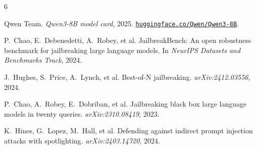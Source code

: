 \documentclass[letterpaper,twocolumn,10pt]{article}
\begin{document}
\begin{thebibliography}{6}
\small\raggedright
{}
Qwen Team. \emph{Qwen3-8B model card}, 2025.
\href{https://huggingface.co/Qwen/Qwen3-8B}{\nolinkurl{huggingface.co/Qwen/Qwen3-8B}}.

P.~Chao, E.~Debenedetti, A.~Robey, et al. JailbreakBench: An open robustness
benchmark for jailbreaking large language models. In \emph{NeurIPS Datasets and
Benchmarks Track}, 2024.

J.~Hughes, S.~Price, A.~Lynch, et al. Best-of-N jailbreaking.
\emph{arXiv:2412.03556}, 2024.

P.~Chao, A.~Robey, E.~Dobriban, et al. Jailbreaking black box large language
models in twenty queries. \emph{arXiv:2310.08419}, 2023.

K.~Hines, G.~Lopez, M.~Hall, et al. Defending against indirect prompt injection
attacks with spotlighting. \emph{arXiv:2403.14720}, 2024.
\end{thebibliography}
\end{document}
